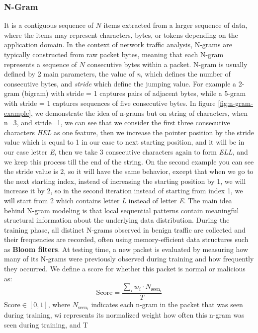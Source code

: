 \subsubsection{N-Gram} 
It is a contiguous sequence of $N$ items extracted from a larger sequence of data, where the items may represent characters, bytes, or tokens depending on the application domain. In the context of network traffic analysis, N-grams are typically constructed from raw packet bytes, meaning that each N-gram represents a sequence of $N$ consecutive bytes within a packet. N-gram is usually defined by 2 main parameters, the value of \textit{n}, which defines the number of consecutive bytes, and \textit{stride} which define the jumping value. For example a 2-gram (bigram) with stride = 1  captures pairs of adjacent bytes, while a 5-gram with stride = 1 captures sequences of five consecutive bytes. In figure \ref{fig:n-gram-example}, we demonstrate the idea of n-grams but on string of characters, when n=3, and stride=1, we can see that we consider the first three consecutive characters \textit{HEL} as one feature, then we increase the pointer position by the stride value which is equal to 1 in our case to next starting position, and it will be in our case letter \textit{E}, then we take 3 consecutive characters again to form \textit{ELL}, and we keep this process till the end of the string. On the second example you can see the stride value is 2, so it will have the same behavior, except that when we go to the next starting index, instead of increasing the starting position by 1, we will increase it by 2, so in the second iteration instead of starting from index 1, we will start from 2 which contains letter \textit{L} instead of letter \textit{E}.  The main idea behind N-gram modeling is that local sequential patterns contain meaningful structural information about the underlying data distribution. During the training phase, all distinct N-grams observed in benign traffic are collected and their frequencies are recorded, often using memory-efficient data structures such as \textbf{Bloom filters}. At testing time, a new packet is evaluated by measuring how many of its N-grams were previously observed during training and how frequently they occurred. We define a score for whether this packet is normal or malicious as: \[
\text{Score} = \frac{\sum_{i} w_i \cdot N_{\text{seen}_i}}{T}
\] 
$\text{Score} \in [0,1]$, where $N_{\text{seen}_i}$
indicates each n-gram in the packet that was seen during training,
wi represents its normalized weight how often this n-gram was seen during training, and T
